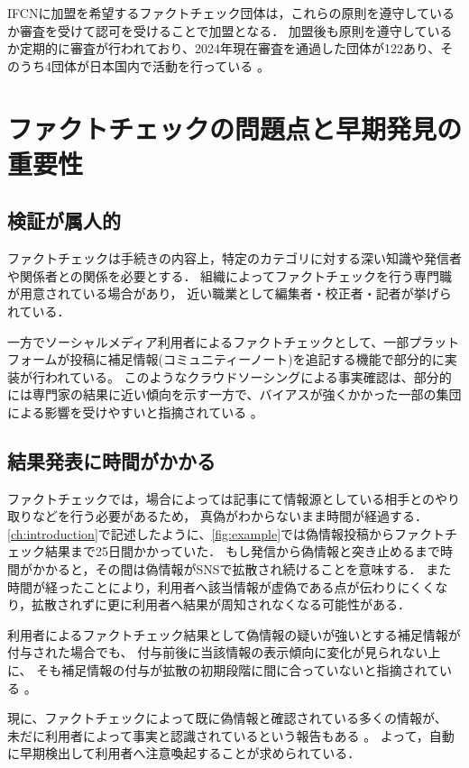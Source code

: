 IFCNに加盟を希望するファクトチェック団体は，これらの原則を遵守しているか審査を受けて認可を受けることで加盟となる．
加盟後も原則を遵守しているか定期的に審査が行われており、2024年現在審査を通過した団体が122あり、そのうち4団体が日本国内で活動を行っている \cite{IFCNCoP}。



\section{ファクトチェックの問題点と早期発見の重要性}
\subsection{検証が属人的}
ファクトチェックは手続きの内容上，特定のカテゴリに対する深い知識や発信者や関係者との関係を必要とする．
組織によってファクトチェックを行う専門職が用意されている場合があり，
近い職業として編集者・校正者・記者が挙げられている\cite{deahl_2019}．

一方でソーシャルメディア利用者によるファクトチェックとして、一部プラットフォームが投稿に補足情報(コミュニティーノート)を追記する機能で部分的に実装が行われている。
このようなクラウドソーシングによる事実確認は、部分的には専門家の結果に近い傾向を示す一方で、バイアスが強くかかった一部の集団による影響を受けやすいと指摘されている \cite{10.1145/3511808.3557279}。

\subsection{結果発表に時間がかかる}
ファクトチェックでは，場合によっては記事にて情報源としている相手とのやり取りなどを行う必要があるため，
真偽がわからないまま時間が経過する．
\cref{ch:introduction}で記述したように、\cref{fig:example}では偽情報投稿からファクトチェック結果まで25日間かかっていた．
もし発信から偽情報と突き止めるまで時間がかかると，その間は偽情報がSNSで拡散され続けることを意味する．
また時間が経ったことにより，利用者へ該当情報が虚偽である点が伝わりにくくなり，拡散されずに更に利用者へ結果が周知されなくなる可能性がある．

利用者によるファクトチェック結果として偽情報の疑いが強いとする補足情報が付与された場合でも、
付与前後に当該情報の表示傾向に変化が見られない上に、
そも補足情報の付与が拡散の初期段階に間に合っていないと指摘されている \cite{chuai2023rollout}。

現に、ファクトチェックによって既に偽情報と確認されている多くの情報が、
未だに利用者によって事実と認識されているという報告もある \cite{真一_2023}。
よって，自動に早期検出して利用者へ注意喚起することが求められている．
